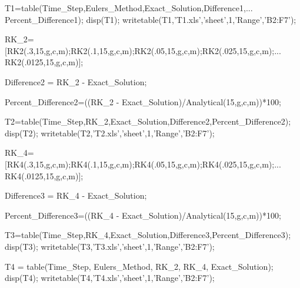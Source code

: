 \documentclass[12pt]{article}
\begin{document}
\begin{verbatimtab}
T1=table(Time_Step,Eulers_Method,Exact_Solution,Difference1,...
         Percent_Difference1);
disp(T1); %
writetable(T1,'T1.xls','sheet',1,'Range','B2:F7');

RK_2=[RK2(.3,15,g,c,m);RK2(.1,15,g,c,m);RK2(.05,15,g,c,m);RK2(.025,15,g,c,m);...
     RK2(.0125,15,g,c,m)];

Difference2 = RK_2 - Exact_Solution;
 
Percent_Difference2=((RK_2 - Exact_Solution)/Analytical(15,g,c,m))*100;

T2=table(Time_Step,RK_2,Exact_Solution,Difference2,Percent_Difference2);
disp(T2); %
writetable(T2,'T2.xls','sheet',1,'Range','B2:F7');

RK_4=[RK4(.3,15,g,c,m);RK4(.1,15,g,c,m);RK4(.05,15,g,c,m);RK4(.025,15,g,c,m);...
     RK4(.0125,15,g,c,m)];
 
Difference3 = RK_4 - Exact_Solution;

Percent_Difference3=((RK_4 - Exact_Solution)/Analytical(15,g,c,m))*100;

T3=table(Time_Step,RK_4,Exact_Solution,Difference3,Percent_Difference3);
disp(T3); %
writetable(T3,'T3.xls','sheet',1,'Range','B2:F7');

T4 = table(Time_Step, Eulers_Method, RK_2, RK_4, Exact_Solution);
disp(T4); %
writetable(T4,'T4.xls','sheet',1,'Range','B2:F7');
\end{verbatimtab}
\end{document}
